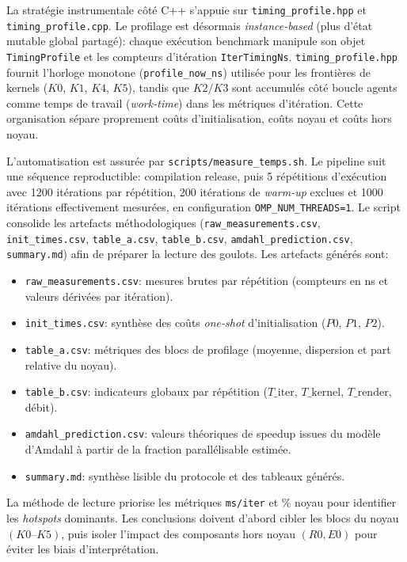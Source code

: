 \noindent
La stratégie instrumentale côté C++ s'appuie sur \texttt{timing\_profile.hpp} et
\texttt{timing\_profile.cpp}. Le profilage est désormais \emph{instance-based} (plus d'état
mutable global partagé): chaque exécution benchmark manipule son objet \texttt{TimingProfile}
et les compteurs d'itération \texttt{IterTimingNs}. \texttt{timing\_profile.hpp} fournit
l'horloge monotone (\texttt{profile\_now\_ns}) utilisée pour les frontières de kernels
(\(K0\), \(K1\), \(K4\), \(K5\)), tandis que \(K2/K3\) sont accumulés côté boucle agents
comme temps de travail (\emph{work-time}) dans les métriques d'itération.
Cette organisation sépare proprement coûts d'initialisation, coûts noyau et coûts hors noyau.

\noindent
L'automatisation est assurée par \texttt{scripts/measure\_temps.sh}. Le pipeline suit une
séquence reproductible: compilation release, puis 5 répétitions d'exécution avec 1200
itérations par répétition, 200 itérations de \textit{warm-up} exclues et 1000 itérations
effectivement mesurées, en configuration \texttt{OMP\_NUM\_THREADS=1}. Le script consolide les
artefacts méthodologiques (\texttt{raw\_measurements.csv}, \texttt{init\_times.csv},
\texttt{table\_a.csv}, \texttt{table\_b.csv}, \texttt{amdahl\_prediction.csv},
\texttt{summary.md}) afin de préparer la lecture des goulots. Les artefacts générés sont:
\begin{itemize}[leftmargin=*]
    \item \texttt{raw\_measurements.csv}: mesures brutes par répétition (compteurs en ns et valeurs dérivées par itération).
    \item \texttt{init\_times.csv}: synthèse des coûts \textit{one-shot} d'initialisation (\(P0\), \(P1\), \(P2\)).
    \item \texttt{table\_a.csv}: métriques des blocs de profilage (moyenne, dispersion et part relative du noyau).
    \item \texttt{table\_b.csv}: indicateurs globaux par répétition (\(T\_\text{iter}\), \(T\_\text{kernel}\), \(T\_\text{render}\), débit).
    \item \texttt{amdahl\_prediction.csv}: valeurs théoriques de speedup issues du modèle d'Amdahl à partir de la fraction parallélisable estimée.
    \item \texttt{summary.md}: synthèse lisible du protocole et des tableaux générés.
\end{itemize}

\noindent
La méthode de lecture priorise les métriques \texttt{ms/iter} et \% noyau pour identifier les
\textit{hotspots} dominants. Les conclusions doivent d'abord cibler les blocs du noyau
\((K0\text{--}K5)\), puis isoler l'impact des composants hors noyau \((R0,E0)\) pour éviter
les biais d'interprétation.

